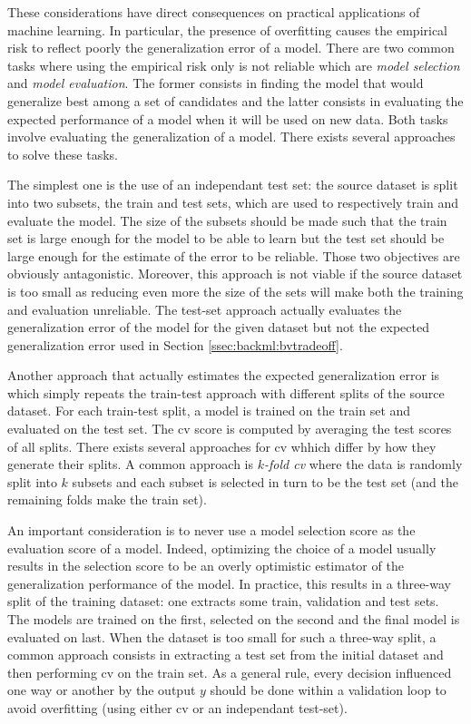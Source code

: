 These considerations have direct consequences on practical applications of machine learning. In particular, the presence of overfitting causes the empirical risk to reflect poorly the generalization error of a model. There are two common tasks where using the empirical risk only is not reliable which are \textit{model selection} and \textit{model evaluation}. The former consists in finding the model that would generalize best among a set of candidates and the latter consists in evaluating the expected performance of a model when it will be used on new data. Both tasks involve evaluating the generalization of a model. There exists several approaches to solve these tasks. 

The simplest one is the use of an independant test set: the source dataset is split into two subsets, the train and test sets, which are used to respectively train and evaluate the model. The size of the subsets should be made such that the train set is large enough for the model to be able to learn but the test set should be large enough for the estimate of the error to be reliable. Those two objectives are obviously antagonistic. Moreover, this approach is not viable if the source dataset is too small as reducing even more the size of the sets will make both the training and evaluation unreliable. The test-set approach actually evaluates the generalization error of the model for the given dataset but not the expected generalization error used in Section \ref{ssec:backml:bvtradeoff}.

Another approach that actually estimates the expected generalization error is  which simply repeats the train-test approach with different splits of the source dataset. For each train-test split, a model is trained on the train set and evaluated on the test set. The \acrlong{cv} score is computed by averaging the test scores of all splits. There exists several approaches for \acrlong{cv} whhich differ by how they generate their splits. A common approach is \textit{$k$-fold \acrlong{cv}} where the data is randomly split into $k$ subsets and each subset is selected in turn to be the test set (and the remaining folds make the train set). 

An important consideration is to never use a model selection score as the evaluation score of a model. Indeed, optimizing the choice of a model usually results in the selection score to be an overly optimistic estimator of the generalization performance of the model. In practice, this results in a three-way split of the training dataset: one extracts some train, validation and test sets. The models are trained on the first, selected on the second and the final model is evaluated on last. When the dataset is too small for such a three-way split, a common approach consists in extracting a test set from the initial dataset and then performing \acrlong{cv} on the train set. As a general rule, every decision influenced one way or another by the output $y$ should be done within a validation loop to avoid overfitting (using either \acrlong{cv} or an independant test-set).

